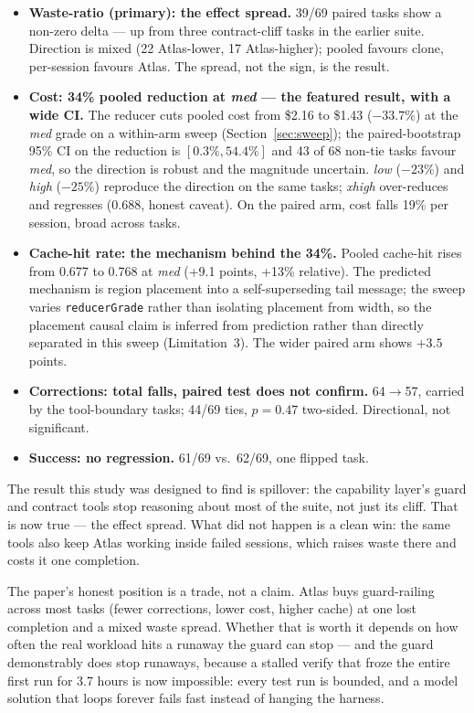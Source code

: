 \documentclass[11pt]{article}
\begin{document}
\begin{itemize}
\item \textbf{Waste-ratio (primary): the effect spread.} 39/69 paired tasks show a non-zero delta --- up from three contract-cliff tasks in the earlier suite. Direction is mixed (22 Atlas-lower, 17 Atlas-higher); pooled favours clone, per-session favours Atlas. The spread, not the sign, is the result.
\item \textbf{Cost: 34\% pooled reduction at \emph{med} --- the featured result, with a wide CI.} The reducer cuts pooled cost from \$2.16 to \$1.43 ($-33.7\%$) at the \emph{med} grade on a within-arm sweep (Section~\ref{sec:sweep}); the paired-bootstrap 95\% CI on the reduction is $[0.3\%, 54.4\%]$ and 43 of 68 non-tie tasks favour \emph{med}, so the direction is robust and the magnitude uncertain. \emph{low} ($-23\%$) and \emph{high} ($-25\%$) reproduce the direction on the same tasks; \emph{xhigh} over-reduces and regresses (0.688, honest caveat). On the paired arm, cost falls 19\% per session, broad across tasks.
\item \textbf{Cache-hit rate: the mechanism behind the 34\%.} Pooled cache-hit rises from 0.677 to 0.768 at \emph{med} (+9.1 points, +13\% relative). The predicted mechanism is region placement into a self-superseding tail message; the sweep varies \texttt{reducerGrade} rather than isolating placement from width, so the placement causal claim is inferred from prediction rather than directly separated in this sweep (Limitation~3). The wider paired arm shows $+3.5$ points.
\item \textbf{Corrections: total falls, paired test does not confirm.} 64$\rightarrow$57, carried by the tool-boundary tasks; 44/69 ties, $p = 0.47$ two-sided. Directional, not significant.
\item \textbf{Success: no regression.} 61/69 vs.\ 62/69, one flipped task.
\end{itemize}

The result this study was designed to find is spillover: the capability layer's guard and contract tools stop reasoning about most of the suite, not just its cliff. That is now true --- the effect spread. What did not happen is a clean win: the same tools also keep Atlas working inside failed sessions, which raises waste there and costs it one completion.

The paper's honest position is a trade, not a claim. Atlas buys guard-railing across most tasks (fewer corrections, lower cost, higher cache) at one lost completion and a mixed waste spread. Whether that is worth it depends on how often the real workload hits a runaway the guard can stop --- and the guard demonstrably does stop runaways, because a stalled verify that froze the entire first run for 3.7 hours is now impossible: every test run is bounded, and a model solution that loops forever fails fast instead of hanging the harness.
\end{document}
